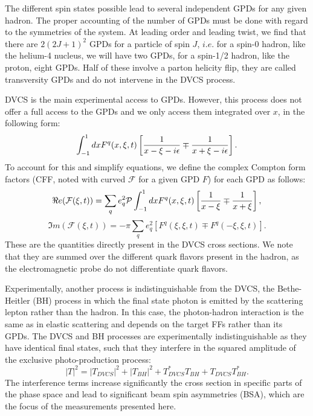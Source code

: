 \documentclass[aps,prc,preprint,superscriptaddress]{revtex4}
\begin{document}
The different spin states possible lead to several independent GPDs for any 
given hadron. The proper accounting of the number of GPDs must be done with 
regard to the symmetries of the system. At leading order and leading twist, we 
find that there are $2(2J+1)^2$ GPDs for a particle of spin $J$, 
$i.e.$ for a spin-0 hadron, like the helium-4 nucleus, we will have two GPDs, 
for a spin-1/2 hadron, like the proton, eight GPDs. Half of these involve a 
parton helicity flip, they are called transversity GPDs and do not intervene 
in the DVCS process. 

DVCS is the main experimental access to GPDs. However, this process does not offer
a full access to the GPDs and we only access them integrated over $x$, in the following form:
\begin{equation}
	\int^1 _{-1} dx F^{q}(x,\xi,t) \left [ {1 \over x - \xi - i \epsilon} 
	                                   \mp {1 \over x + \xi - i \epsilon} \right]. 
\end{equation}
To account for this and simplify equations, we define the complex Compton form factors (CFF,
noted with curved $\mathcal{F}$ for a given GPD $F$) for each GPD as follows:
\begin{equation}
	\Re e (\mathcal{F}(\xi,t)) = \sum _q e^2_q \mathcal{P} \int^1_{-1} dx F^{q}(x,\xi,t)
	      \left [ {1 \over x - \xi} \mp {1 \over x + \xi} \right], 
\end{equation}
\begin{equation}
	\Im m (\mathcal{F}(\xi,t)) = - \pi \sum _q e^2_q \left [ F^{q}(\xi,\xi,t) \mp F^{q}(-\xi,\xi,t) \right]. 
\end{equation} 
These are the quantities directly present in the DVCS cross sections. We note that they are summed over
the different quark flavors present in the hadron, as the electromagnetic probe do not differentiate
quark flavors.

Experimentally, another process is indistinguishable from the DVCS, the Bethe-Heitler (BH) 
process in which 
the final state photon is emitted by the scattering lepton rather than the hadron. In this case, the 
photon-hadron interaction is the same as in elastic scattering and depends on the
target FFs rather than its GPDs. The DVCS and BH processes are experimentally indistinguishable as they
have identical final states, such that they interfere in the squared amplitude of the
exclusive photo-production process:
\begin{equation}
	|T|^2 = |T_{DVCS}|^2 + |T_{BH}|^2 + T_{DVCS}^* T_{BH} + T_{DVCS}T_{BH}^*. 
\end{equation}
The interference terms increase significantly the cross section in specific parts of the phase space
and lead to significant beam spin asymmetries (BSA), which are the focus of the measurements presented 
here. 
\end{document}
